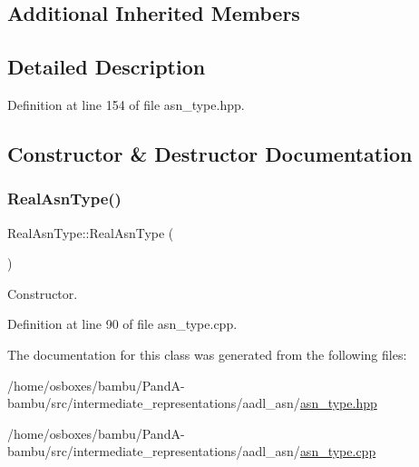 \subsection*{Additional Inherited Members}


\subsection{Detailed Description}


Definition at line 154 of file asn\+\_\+type.\+hpp.



\subsection{Constructor \& Destructor Documentation}
\mbox{\label{classRealAsnType_a090065c4c1be898fdd52bb43a00d745b}} 
\subsubsection{\texorpdfstring{Real\+Asn\+Type()}{RealAsnType()}}
{\footnotesize\ttfamily Real\+Asn\+Type\+::\+Real\+Asn\+Type (\begin{DoxyParamCaption}{ }\end{DoxyParamCaption})}



Constructor. 



Definition at line 90 of file asn\+\_\+type.\+cpp.



The documentation for this class was generated from the following files\+:\begin{DoxyCompactItemize}
\item 
/home/osboxes/bambu/\+Pand\+A-\/bambu/src/intermediate\+\_\+representations/aadl\+\_\+asn/\hyperlink{asn__type_8hpp}{asn\+\_\+type.\+hpp}\item 
/home/osboxes/bambu/\+Pand\+A-\/bambu/src/intermediate\+\_\+representations/aadl\+\_\+asn/\hyperlink{asn__type_8cpp}{asn\+\_\+type.\+cpp}\end{DoxyCompactItemize}
